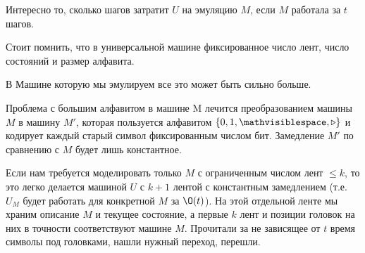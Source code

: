 Интересно то, сколько шагов затратит $U$ на эмуляцию $M$, если $M$ работала за $t$ шагов.

\begin{Rem}
	Стоит помнить, что в универсальной машине фиксированное число лент, 
	число состояний и размер алфавита. 

	В Машине которую мы эмулируем все это может быть сильно больше. 
	
	Проблема с большим алфавитом в машине M лечится преобразованием машины $M$
	в машину $M'$, которая пользуется алфавитом $\{0, 1, \mathvisiblespace, \triangleright\}$ и кодирует каждый старый символ
	фиксированным числом бит.
	Замедление $M'$ по сравнению с $M$ будет лишь константное.
\end{Rem}
	
Если нам требуется моделировать только $M$ с ограниченным числом лент $\le k$, то
это легко делается машиной $U$ с $k+1$ лентой с константным замедлением (т.е. $U_M$ будет работать для конкретной $M$ за $\O(t)$).
На этой отдельной ленте мы храним описание $M$ и текущее состояние, а первые $k$ лент и позиции головок на них в точности соответствуют машине $M$.
Прочитали за не зависящее от $t$ время символы под головками, нашли нужный переход, перешли.

